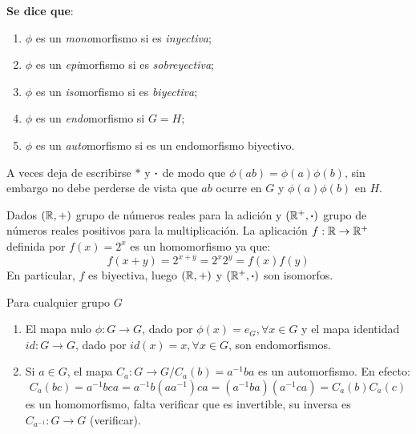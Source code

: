 \textbf{Se dice que}:
\begin{enumerate}[label=\roman*)]
	\item $\phi$ es un \textit{mono}morfismo si es \textit{inyectiva};
	\item $\phi$ es un \textit{epi}morfismo si es \textit{sobreyectiva};
	\item $\phi$ es un \textit{iso}morfismo si es \textit{biyectiva};
	\item $\phi$ es un \textit{endo}morfismo si $G = H$;
	\item $\phi$ es un \textit{auto}morfismo si es un endomorfismo biyectivo.
\end{enumerate}
A veces deja de escribirse $*$ y $\boldsymbol{\cdot}$ de modo que $\phi(ab) = \phi(a)\phi(b)$, sin embargo no debe perderse de vista que $ab$ ocurre en $G$ y $\phi(a)\phi(b)$ en $H$.

\begin{fmd-example}
	Dados $(\mathbb{R}, +)$ grupo de números reales para la adición y $(\mathbb{R}^+, \boldsymbol{\cdot})$ grupo de números reales positivos para la multiplicación. La aplicación $f: \mathbb{R} \rightarrow \mathbb{R}^+$ definida por $f(x) = 2^x$ es un homomorfismo ya que:
	\[ f(x + y) = 2^{x + y} = 2^x 2^y = f(x)f(y)\]
	En particular, $f$ es biyectiva, luego $(\mathbb{R}, +)$ y $(\mathbb{R}^+, \boldsymbol{\cdot})$ son isomorfos.
\end{fmd-example}

\begin{fmd-example}
	Para cualquier grupo $G$
	
	\begin{enumerate} 
		\item El mapa nulo $\phi: G \rightarrow G$, dado por $\phi(x) = e_G, \forall x \in G$ y el mapa identidad $id: G \rightarrow G$, dado por $id(x) = x, \forall x \in G$, son endomorfismos.
		\item Si $a\in G$, el mapa $C_a: G \rightarrow G / C_a(b) = a^{-1}ba$ es un automorfismo. En efecto: \vspace{-1mm}
		\[ C_a(bc) = a^{-1}bca = a^{-1}b (aa^{-1}) ca = (a^{-1}ba)(a^{-1} ca) = C_a(b)C_a(c)\]
		es un homomorfismo, falta verificar que es invertible, su inversa es $C_{a^{-1}}: G \rightarrow G$ (verificar).
	\end{enumerate}
\end{fmd-example}

